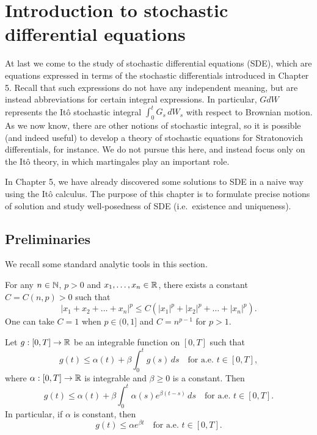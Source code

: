 \section{Introduction to stochastic differential equations}

At last we come to the study of stochastic differential equations (SDE), which are equations expressed in terms of the stochastic differentials introduced in Chapter 5. Recall that such expressions do not have any independent meaning, but are instead abbreviations for certain integral expressions. In particular, $GdW$ represents the It\^{o} stochastic integral $\int_0^t G_s\,dW_s$ with respect to Brownian motion. As we now know, there are other notions of stochastic integral, so it is possible (and indeed useful) to develop a theory of stochastic equations for Stratonovich differentials, for instance. We do not pursue this here, and instead focus only on the It\^{o} theory, in which martingales play an important role.

In Chapter 5, we have already discovered some solutions to SDE in a naive way using the It\^{o} calculus. The purpose of this chapter is to formulate precise notions of solution and study well-posedness of SDE (i.e.\ existence and uniqueness).

\subsection{Preliminaries}
We recall some standard analytic tools in this section.

\begin{exercise}
	\label{exer:convexity}
	For any $n\in\mathbb{N}$, $p>0$ and $x_1,\ldots,x_n\in\mathbb{R}$, there exists a constant $C=C(n,p)>0$ such that
	\begin{equation*}
		|x_1+x_2+\ldots+x_n|^p \le C(|x_1|^p +|x_2|^p +\ldots +|x_n|^p).
	\end{equation*}
	One can take $C=1$ when $p\in (0,1]$ and $C=n^{p-1}$ for $p>1$.
\end{exercise}

\begin{lemma}
	Let $g:[0,T]\to\mathbb{R}$ be an integrable function on $[0,T]$ such that
	\begin{equation*}
		g(t) \le \alpha(t) + \beta\int_0^t g(s)\,ds \quad\text{for a.e. } t\in [0,T],
	\end{equation*}
	where $\alpha:[0,T]\to\mathbb{R}$ is integrable and $\beta\ge 0$ is a constant. Then
	\begin{equation}
		g(t) \le \alpha(t) + \beta\int_0^t \alpha(s)e^{\beta(t-s)}\,ds \quad\text{for a.e. }t\in [0,T].
	\end{equation}
	In particular, if $\alpha$ is constant, then
	\begin{equation}
		g(t) \le \alpha e^{\beta t} \quad\text{for a.e. }t\in [0,T].
	\end{equation}
\end{lemma}

